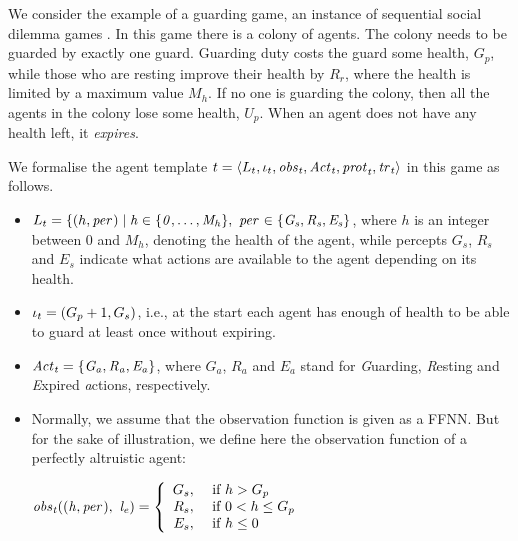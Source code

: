 \begin{example}
  \label{ex:agent-template}
  We consider the example of a guarding game, an instance of sequential social
  dilemma games \cite{LeiboZLMG17}. In this game there is a colony of
  agents. The colony needs to be guarded by exactly one guard. Guarding duty
  costs the guard some health, $G_p$, while those who are resting improve their
  health by $R_r$, where the health is limited by a maximum value $M_h$. If no
  one is guarding the colony, then all the agents in the colony lose some
  health, $U_p$. When an agent does not have any health left, it
  \emph{expires}.

  We formalise the agent template
  ${t} = \left \langle L_{t}, \iota_{t}, \it{obs}_{t}, \it{Act}_{t}, \it{prot}_{t}, \it{tr}_{t}  \right \rangle$
  in this game as follows.

 
  \begin{itemize}[$\bullet$]
  \item
    $L_{t} = \{(h,\it{per}_{}) \mid h \in \{0,\dots,M_h\}, \ \it{per}_{} \in \{G_s,
    R_s, E_s\}$, where $h$ is an integer between 0 and $M_h$, denoting the
    health of the agent, while percepts $G_s$, $R_s$ and $E_s$ indicate what
    actions are available to the agent depending on its health.

  \item $\iota_{t} = (G_p + 1, G_s)$, i.e., at the start each agent has enough
    of health to be able to guard at least once without expiring.
    
  \item $\it{Act}_{t} = \{G_a, R_a, E_a\}$, where $G_a$, $R_a$ and $E_a$ stand for
    \emph{G}uarding, \emph{R}esting and \emph{E}xpired \emph{a}ctions,
    respectively.
  

  \item Normally, we assume that the observation function is given as a
    FFNN. But for the sake of illustration, we define here the observation
    function of a perfectly altruistic agent:

    $\it{obs}_{t}((h,\it{per}_{}), \ l_{e}) = \left\{
      \begin{array}{rl}
        G_s, & \text{ if } h > G_p\\ 
        R_s, & \text{ if } 0 < h \leq G_p\\ 
        E_s, & \text{ if } h \leq 0\\
      \end{array} \right.$
    

\end{itemize}
\end{example}
